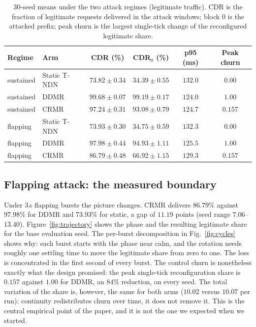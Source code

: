 \documentclass[10pt,a4paper]{article}
\begin{document}
\begin{table}[t]
\centering
\small
\caption{30-seed means under the two attack regimes (legitimate traffic). CDR is
the fraction of legitimate requests delivered in the attack windows; block 0 is
the attacked prefix; peak churn is the largest single-tick change of the
reconfigured legitimate share.}
\label{tab:results}
\begin{tabular}{@{}llcccc@{}}
\toprule
Regime & Arm & CDR (\%) & CDR$_0$ (\%) & p95 (ms) & Peak churn \\
\midrule
sustained & Static T-NDN & $73.82\pm0.34$ & $34.39\pm0.55$ & $132.0$ & $0.00$ \\
sustained & DDMR & $99.68\pm0.07$ & $99.19\pm0.17$ & $124.0$ & $1.00$ \\
sustained & CRMR & $97.24\pm0.31$ & $93.08\pm0.79$ & $124.7$ & $0.157$ \\
\midrule
flapping & Static T-NDN & $73.93\pm0.30$ & $34.75\pm0.59$ & $132.3$ & $0.00$ \\
flapping & DDMR & $97.98\pm0.44$ & $94.93\pm1.11$ & $125.5$ & $1.00$ \\
flapping & CRMR & $86.79\pm0.48$ & $66.92\pm1.15$ & $129.3$ & $0.157$ \\
\bottomrule
\end{tabular}
\end{table}

\subsection{Flapping attack: the measured boundary}
Under 3\,s flapping bursts the picture changes. CRMR delivers $86.79\%$ against
$97.98\%$ for DDMR and $73.93\%$ for static, a gap of $11.19$ points
(seed range $7.06$--$13.40$). Figure~\ref{fig:trajectory} shows the phase and the
resulting legitimate share for the base evaluation seed. The per-burst
decomposition in
Fig.~\ref{fig:cycles} shows why: each burst starts with the phase near calm, and
the rotation needs roughly one settling time to move the legitimate share from
zero to one. The loss is concentrated in the first second of every burst. The
control churn is nonetheless exactly what the design promised: the peak
single-tick reconfiguration share is $0.157$ against $1.00$ for DDMR, an $84\%$
reduction, on every seed. The total variation of the share is, however, the same
for both arms ($10.02$ versus $10.07$ per run): continuity redistributes churn
over time, it does not remove it. This is the central empirical point of the
paper, and it is not the one we expected when we started.
\end{document}
